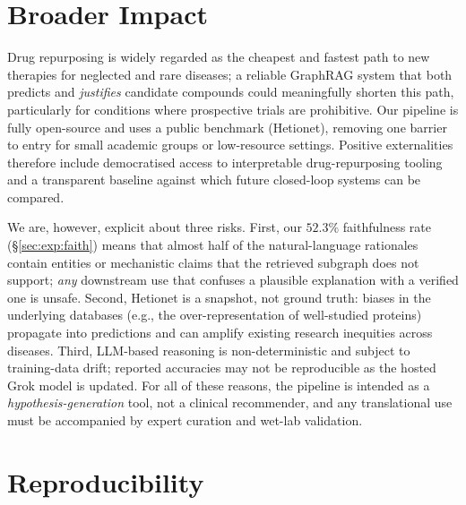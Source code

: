 \documentclass{article}
\begin{document}
\section{Broader Impact}
\label{sec:impact}

Drug repurposing is widely regarded as the cheapest and fastest path to new therapies for neglected and rare diseases; a reliable GraphRAG system that both predicts and \emph{justifies} candidate compounds could meaningfully shorten this path, particularly for conditions where prospective trials are prohibitive. Our pipeline is fully open-source and uses a public benchmark (Hetionet), removing one barrier to entry for small academic groups or low-resource settings. Positive externalities therefore include democratised access to interpretable drug-repurposing tooling and a transparent baseline against which future closed-loop systems can be compared.

We are, however, explicit about three risks. First, our $52.3\%$ faithfulness rate (\S\ref{sec:exp:faith}) means that almost half of the natural-language rationales contain entities or mechanistic claims that the retrieved subgraph does not support; \emph{any} downstream use that confuses a plausible explanation with a verified one is unsafe. Second, Hetionet is a snapshot, not ground truth: biases in the underlying databases (e.g., the over-representation of well-studied proteins) propagate into predictions and can amplify existing research inequities across diseases. Third, LLM-based reasoning is non-deterministic and subject to training-data drift; reported accuracies may not be reproducible as the hosted Grok model is updated. For all of these reasons, the pipeline is intended as a \emph{hypothesis-generation} tool, not a clinical recommender, and any translational use must be accompanied by expert curation and wet-lab validation.

\section{Reproducibility}
\label{sec:reproducibility}
\end{document}
